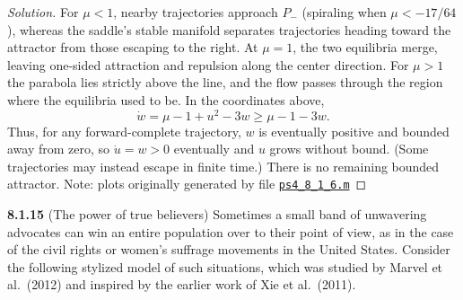 \documentclass[10pt]{amsart}
\newenvironment{solution}
{\begin{proof}[Solution]}
{\end{proof}}
\begin{document}
\begin{onehalfspace}
\begin{solution}
For $\mu<1$, nearby trajectories approach $P_-$ (spiraling when $\mu<-17/64$), whereas the saddle's stable manifold separates trajectories heading toward the attractor from those escaping to the right. At $\mu=1$, the two equilibria merge, leaving one-sided attraction and repulsion along the center direction. For $\mu>1$ the parabola lies strictly above the line, and the flow passes through the region where the equilibria used to be. In the coordinates above,
\[
    \dot{w}=\mu-1+u^2-3w\geq\mu-1-3w.
\]
Thus, for any forward-complete trajectory, $w$ is eventually positive and bounded away from zero, so $\dot{u}=w>0$ eventually and $u$ grows without bound. (Some trajectories may instead escape in finite time.) There is no remaining bounded attractor.
Note: plots originally generated by file \href{https://github.com/chtompki/MathFall2026/tree/main/DynamicalSystems/ProblemSet4/ps4_8_1_6.m}{\nolinkurl{ps4_8_1_6.m}}
        \end{solution}

        \noindent\textbf{8.1.15}
        (The power of true believers) Sometimes a small band of unwavering advocates can win an entire population over to their point of view, as in the case of the civil rights or women's suffrage movements in the United States. Consider the following stylized model of such situations, which was studied by Marvel et al.\ (2012) and inspired by the earlier work of Xie et al.\ (2011).
        

\end{onehalfspace}
\end{document}
